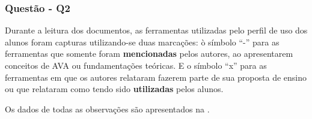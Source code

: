 
\subsubsection{Questão - Q2}
Durante a leitura dos documentos, as ferramentas utilizadas pelo perfil de uso dos alunos foram capturas utilizando-se duas marcações: ò símbolo ``-'' para as ferramentas que somente foram \textbf{mencionadas} pelos autores, ao apresentarem conceitos de AVA ou fundamentações teóricas. E o símbolo ``x'' para as ferramentas em que os autores relataram fazerem parte de sua proposta de ensino ou que relataram como tendo sido \textbf{utilizadas} pelos alunos.

Os dados de todas as observações são apresentados na .

